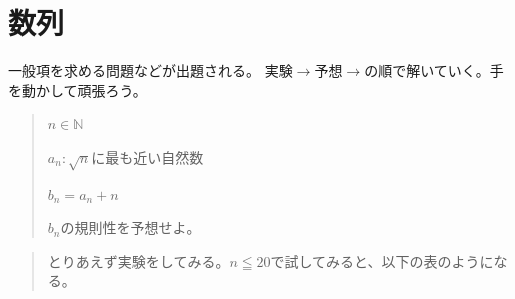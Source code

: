 \documentclass[uplatex,fleqn]{jsbook}
\begin{document}
\section{数列}
一般項を求める問題などが出題される。
実験$\rightarrow$予想$\rightarrow$の順で解いていく。手を動かして頑張ろう。

\begin{quote}
    $n\in \mathbb{N}$

    $a_n:\sqrt{n}$に最も近い自然数

    $b_n=a_n+n$

    $b_n$の規則性を予想せよ。
\end{quote}

\begin{quote}
    とりあえず実験をしてみる。$n\leqq 20$で試してみると、以下の表のようになる。


\end{quote}
\end{document}
